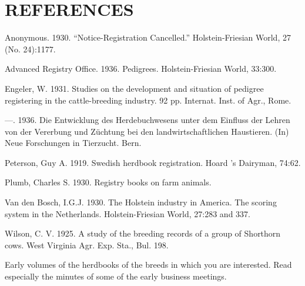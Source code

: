 \section*{REFERENCES}

\begin{hangparas}{0.5in}{1}%
Anonymous. 1930. ``Notice-Registration Cancelled.'' Holstein-Friesian World,
27 (No. 24):1177.

Advanced Registry Office. 1936. Pedigrees. Holstein-Friesian World, 33:300.

Engeler, W. 1931. Studies on the development and situation of pedigree registering
in the cattle-breeding industry. 92 pp. Internat. Inst. of Agr., Rome.

---. 1936. Die Entwicklung des Herdebuchwesens unter dem Einfluss der Lehren von der Vererbung
und Z\"{u}chtung bei den landwirtschaftlichen Haustieren. (In) Neue Forschungen in Tierzucht. Bern.

Peterson, Guy A. 1919. Swedish herdbook registration. Hoard 's Dairyman, 74:62.

Plumb, Charles S. 1930. Registry books on farm animals.
 
Van den Bosch, I.G.J. 1930. The Holstein industry in America. The scoring system in the Netherlands. 
Holstein-Friesian World, 27:283 and 337.

Wilson, C. V. 1925. A study of the breeding records of a group of Shorthorn cows. West Virginia Agr. Exp. Sta., Bul. 198.

Early volumes of the herdbooks of the breeds in which you are interested. Read especially the minutes 
of some of the early business meetings.
\end{hangparas}